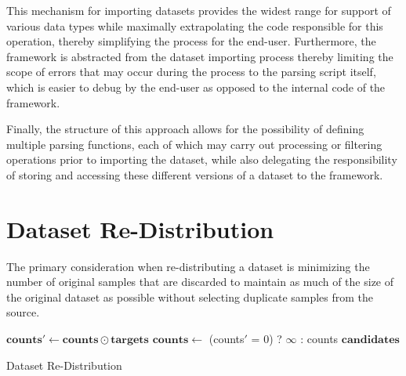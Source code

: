 \documentclass[12pt, a4paper]{report}
\makeatletter
\theoremstyle{definition}
\theoremstyle{definition}%
\theoremstyle{definition}%
\theoremstyle{definition}%
\theoremstyle{definition}%
\theoremstyle{definition}%
\newcommand{\algorithmfootnote}[2][\footnotesize]{%
  \let\old@algocf@finish\@algocf@finish%
  \def\@algocf@finish{\old@algocf@finish%
    \leavevmode\rlap{\begin{minipage}{\linewidth}
    #1#2
    \end{minipage}}%
  }%
}
\makeatother
\begin{document}
This mechanism for importing datasets provides the widest range for support of various data types while maximally extrapolating the code responsible for this operation, thereby simplifying the process for the end-user. Furthermore, the framework is abstracted from the dataset importing process thereby limiting the scope of errors that may occur during the process to the parsing script itself, which is easier to debug by the end-user as opposed to the internal code of the framework.

Finally, the structure of this approach allows for the possibility of defining multiple parsing functions, each of which may carry out processing or filtering operations prior to importing the dataset, while also delegating the responsibility of storing and accessing these different versions of a dataset to the framework.

\section{Dataset Re-Distribution} \label{sec:dataset_redist}
The primary consideration when re-distributing a dataset is minimizing the number of original samples that are discarded to maintain as much of the size of the original dataset as possible without selecting duplicate samples from the source.

\vspace{\baselineskip}
\begin{algorithm}[H]
	\SetAlgoLined
	\DontPrintSemicolon
	\algorithmfootnote{Ternary operations are applied element-wise}
	$\mathbf{counts'} \gets \mathbf{counts} \odot \mathbf{targets}$\;
	$\mathbf{counts} \gets$ (counts$'$ = 0) ? $\infty$ : counts\;  
	\Return $\mathbf{candidates}$
	\caption{Dataset Re-Distribution}
	\label{alg:re_dist}
\end{algorithm}
\vspace{\baselineskip}
\end{document}
